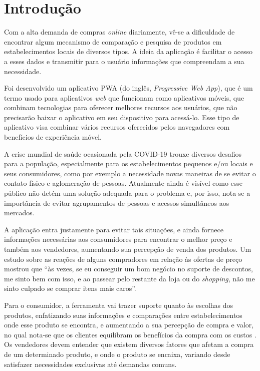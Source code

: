 \section{Introdução}
\label{sec:introducao}

Com a alta demanda de compras \textit{online} diariamente, vê-se a dificuldade de encontrar algum mecanismo de comparação e pesquisa de produtos em estabelecimentos locais de diversos tipos. A ideia da aplicação é facilitar o acesso a esses dados e transmitir para o usuário informações que compreendam a sua necessidade.

Foi desenvolvido um aplicativo PWA (do inglês, \textit{Progressive Web App}), que é um termo usado para aplicativos \textit{web} que funcionam como aplicativos móveis, que combinam tecnologias para oferecer melhores recursos aos usuários, que não precisarão baixar o aplicativo em seu dispositivo para acessá-lo. Esse tipo de aplicativo visa combinar vários recursos oferecidos pelos navegadores com benefícios de experiência móvel. \cite{souza2017pwa}

A crise mundial de saúde ocasionada pela COVID-19 trouxe diversos desafios para a população, especialmente para os estabelecimentos pequenos e/ou locais e seus consumidores, como por exemplo a necessidade novas maneiras de se evitar o contato físico e aglomeração de pessoas. Atualmente ainda é visível como esse público não detém uma solução adequada para o problema e, por isso, nota-se a importância de evitar agrupamentos de pessoas e acessos simultâneos aos mercados.

A aplicação entra justamente para evitar tais situações, e ainda fornece informações necessárias aos consumidores para encontrar o melhor preço e também aos vendedores, aumentando sua percepção de venda dos produtos. Um estudo sobre as reações de alguns compradores em relação às ofertas de preço mostrou que ``às vezes, se eu conseguir um bom negócio no suporte de descontos, me sinto bem com isso, e  ao passear pelo restante da loja ou do \textit{shopping}, não me sinto culpado se comprar itens mais caros''. \cite{grewal1998effects}

Para o consumidor, a ferramenta vai trazer suporte quanto às escolhas dos produtos, enfatizando suas informações e comparações entre estabelecimentos onde esse produto se encontra, e aumentando a sua percepção de compra e valor, no qual nota-se que os clientes equilibram os benefícios da compra com os custos \cite{grewal1998effects}. Os vendedores devem entender que existem diversos fatores que afetam a compra de um determinado produto, e onde o produto se encaixa, variando desde satisfazer necessidades exclusivas até demandas comuns. \cite{grewal1998effects}
